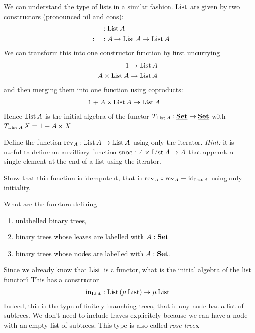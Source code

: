 We can understand the type of lists in a similar fashion. $\mathrm{List}$ are given by two constructors (pronounced nil and cons):
\begin{align*}
[] & : \List\,A \\
\_\cons\_ & : A \to \List\,A \to \List\,A
\end{align*}
We can transform this into one constructor function by first uncurrying
\begin{align*}
1 & \to \mathrm{List}\,A \\
A \times \mathrm{List}\,A & \to \mathrm{List}\,A
\end{align*}
and then merging them into one function using coproducts:
\begin{align*}
1 + A \times \mathrm{List}\,A & \to \mathrm{List}\,A
\end{align*}
Hence $\mathrm{List}\,A$ is the initial algebra of the functor $T_{\mathrm{List}\,A}:\underline{\mathbf{\mathbf{Set}}} \to \underline{\mathbf{\mathbf{Set}}}$ with $T_{\mathrm{List}\,A}\,X = 1 + A \times X$.
\begin{exercise}
Define the function $\mathrm{rev}_A : \mathrm{List}\,A \to \mathrm{List}\,A$ using only the iterator. \emph{Hint:} it is useful to define an auxilliary function 
$\mathrm{snoc} : A \times\mathrm{List}\,A \to A$ that appends a single element at the end of a list using the iterator. 

Show that this function is idempotent, that is $\mathrm{rev}_A \circ \mathrm{rev}_A = \mathrm{id}_{\mathrm{List}\,A}$ using only initiality. 
\end{exercise}

\begin{exercise}
What are the functors defining 
\begin{enumerate}
\item unlabelled binary trees,
\item binary trees whose leaves are labelled with $A:\mathbf{Set}$,
\item binary trees whose nodes  are labelled with $A:\mathbf{Set}$,
\end{enumerate}
\end{exercise}

Since we already know that $\mathrm{List}$ is a functor, what is the initial algebra of the list functor? This has a constructor
\begin{align*}
\mathrm{in}_{\mathrm{List}} : \mathrm{List} \,(\mu\,\mathrm{List}) \to \mu\,\mathrm{List}
\end{align*}
Indeed, this is the type of finitely branching trees, that is any node has a list of subtrees. We don't need to include leaves explicitely because we can have a node with an empty list of subtrees. This type is also called \emph{rose trees}.

